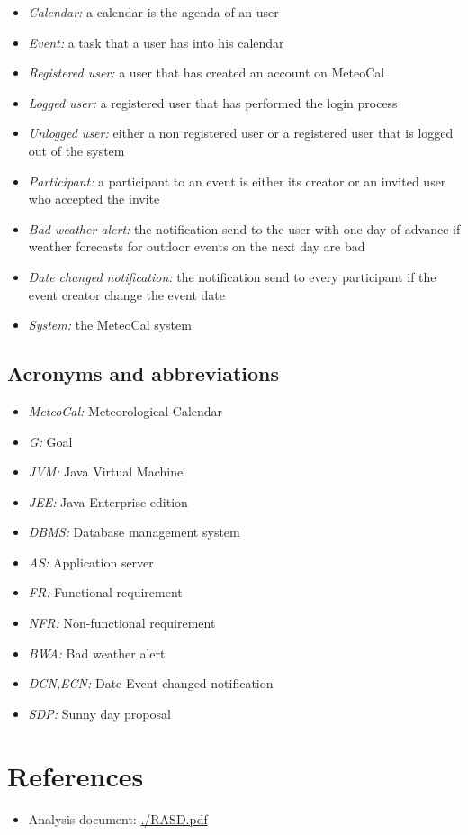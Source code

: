 \documentclass[10pt,a4paper,titlepage]{article}
\begin{document}
\begin{itemize}
\item \emph{Calendar:} a calendar is the agenda of an user
\item \emph{Event:} a task that a user has into his calendar
\item \emph{Registered user:} a user that has created an account on MeteoCal
\item \emph{Logged user:} a registered user that has performed the login process
\item \emph{Unlogged user:} either a non registered user or a registered user that is logged out of the system
\item \emph{Participant:} a participant to an event is either its creator or an invited user who accepted the invite
\item \emph{Bad weather alert:} the notification send to the user with one day of advance if weather forecasts for outdoor events on the next day are bad
\item \emph{Date changed notification:} the notification send to every participant if the event creator change the event date
\item \emph{System:} the MeteoCal system
\end{itemize}

\subsection{Acronyms and abbreviations}
\begin{itemize}
\item \emph{MeteoCal:} Meteorological Calendar
\item \emph{G:} Goal
\item \emph{JVM:} Java Virtual Machine
\item \emph{JEE:} Java Enterprise edition
\item \emph{DBMS:} Database management system
\item \emph{AS:} Application server
\item \emph{FR:} Functional requirement
\item \emph{NFR:} Non-functional requirement
\item \emph{BWA:} Bad weather alert
\item \emph{DCN,ECN:} Date-Event changed notification
\item \emph{SDP:} Sunny day proposal 
\end{itemize}

\section{References}
\begin{itemize}
\item Analysis document: \url{./RASD.pdf}
\end{itemize}
\end{document}
